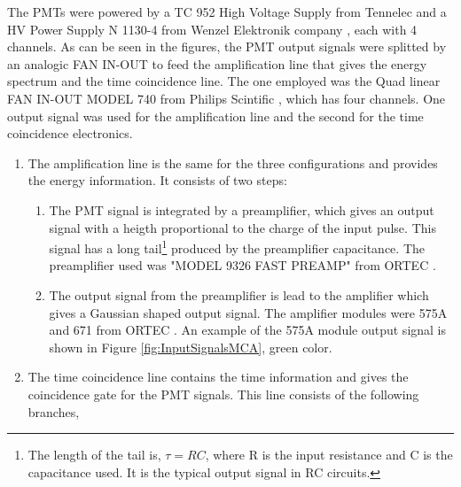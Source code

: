 The PMTs were powered by a TC 952 High Voltage Supply from Tennelec \cite{DataSheetHVSupplyTennelec} and a HV Power Supply N 1130-4 from Wenzel Elektronik company \cite{DataSheetHVSupplyWenzel}, each with 4 channels. As can be seen in the figures, the PMT output signals were splitted by an analogic FAN IN-OUT to feed the amplification line that gives the energy spectrum and the time coincidence line. The one employed was the Quad linear FAN IN-OUT MODEL 740 from Philips Scintific \cite{DataSheetFANINOUT}, which has four channels. One output signal was used for the amplification line and the second for the time coincidence electronics.

\begin{enumerate}

\item{} The amplification line is the same for the three configurations and provides the energy information. It consists of two steps:



\begin{enumerate}

\item{} The PMT signal is integrated by a preamplifier, which gives an output signal with a heigth proportional to the charge of the input pulse. This signal has a long tail\footnote{The length of the tail is, $\tau=RC$, where R is the input resistance and C is the capacitance used. It is the typical output signal in RC circuits.} produced by the preamplifier capacitance. The preamplifier used was "MODEL 9326 FAST PREAMP" from ORTEC \cite{DataSheetPreAmp}.

\item{} The output signal from the preamplifier is lead to the amplifier which gives a Gaussian shaped output signal. The amplifier modules were 575A and 671 from ORTEC \cite{DataSheet575Amp, DataSheet671Amp}. An example of the 575A module output signal is shown in Figure \ref{fig:InputSignalsMCA}, green color.

\end{enumerate}

\item{} The time coincidence line contains the time information and gives the coincidence gate for the PMT signals. This line consists of the following branches,


\end{enumerate}
